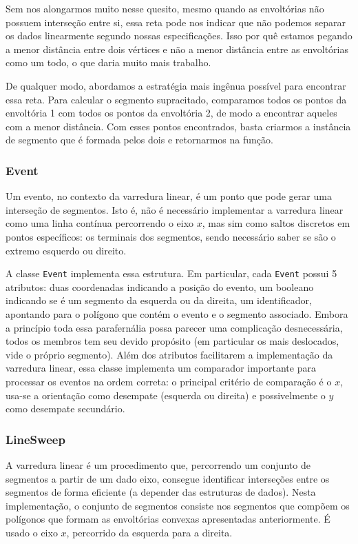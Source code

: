 \documentclass{article}
\begin{document}
Sem nos alongarmos muito nesse quesito, mesmo quando as envoltórias não possuem interseção entre si, essa reta pode nos indicar que não podemos separar os dados linearmente segundo nossas especificações. Isso por quê estamos pegando a menor distância entre dois vértices e não a menor distância entre as envoltórias como um todo, o que daria muito mais trabalho.

De qualquer modo, abordamos a estratégia mais ingênua possível para encontrar essa reta. Para calcular o segmento supracitado, comparamos todos os pontos da envoltória 1 com todos os pontos da envoltória 2, de modo a encontrar aqueles com a menor distância. Com esses pontos encontrados, basta criarmos a instância de segmento que é formada pelos dois e retornarmos na função.

\subsubsection{Event}

Um evento, no contexto da varredura linear, é um ponto que pode gerar uma interseção de segmentos. Isto é, não é necessário implementar a varredura linear como uma linha contínua percorrendo o eixo \( x \), mas sim como saltos discretos em pontos específicos: os terminais dos segmentos, sendo necessário saber se são o extremo esquerdo ou direito.

A classe \texttt{Event} implementa essa estrutura. Em particular, cada \texttt{Event} possui 5 atributos: duas coordenadas indicando a posição do evento, um booleano indicando se é um segmento da esquerda ou da direita, um identificador, apontando para o polígono que contém o evento e o segmento associado. Embora a princípio toda essa parafernália possa parecer uma complicação desnecessária, todos os membros tem seu devido propósito (em particular os mais deslocados, vide o próprio segmento). Além dos atributos facilitarem a implementação da varredura linear, essa classe implementa um comparador importante para processar os eventos na ordem correta: o principal critério de comparação é o \( x \), usa-se a orientação como desempate (esquerda ou direita) e possivelmente o \( y \) como desempate secundário.

\subsubsection{LineSweep}

A varredura linear é um procedimento que, percorrendo um conjunto de segmentos a partir de um dado eixo, consegue identificar interseções entre os segmentos de forma eficiente (a depender das estruturas de dados). Nesta implementação, o conjunto de segmentos consiste nos segmentos que compõem os polígonos que formam as envoltórias convexas apresentadas anteriormente. É usado o eixo \( x \), percorrido da esquerda para a direita.
\end{document}
